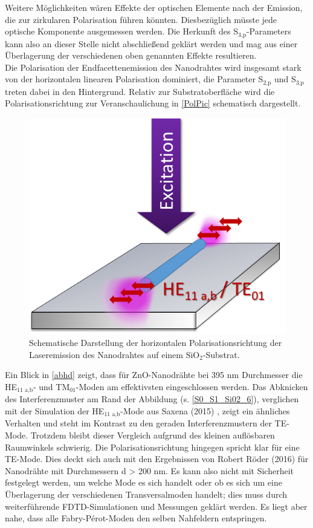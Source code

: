 Weitere Möglichkeiten wären Effekte der optischen Elemente nach der Emission, die zur zirkularen Polarisation führen könnten. Diesbezüglich müsste jede optische Komponente ausgemessen werden. Die Herkunft des S$_\text{3,p}$-Parameters kann also an dieser Stelle nicht abschließend geklärt werden und mag aus einer Überlagerung der verschiedenen oben genannten Effekte resultieren.\\
Die Polarisation der Endfacettenemission des Nanodrahtes wird insgesamt stark von der horizontalen linearen Polarisation dominiert, die Parameter S$_\text{2,p}$ und S$_\text{3,p}$ treten dabei in den Hintergrund. Relativ zur Substratoberfläche wird die Polarisationsrichtung zur Veranschaulichung in \autoref{PolPic} schematisch dargestellt.\begin{figure}[b]
\centering
\includegraphics[width=.35\textwidth]{Bilder/SiO2/PolPic}
\caption{Schematische Darstellung der horizontalen Polarisationsrichtung der Laseremission des Nanodrahtes auf einem SiO$_\text{2}$-Substrat.}
\label{PolPic}
\end{figure}Ein Blick in \autoref{abhd} zeigt, dass für ZnO-Nanodrähte bei 395 nm Durchmesser die HE$_\text{11 a,b}$- und TM$_\text{01}$-Moden am effektivsten eingeschlossen werden. Das Abknicken des Interferenzmuster am Rand der Abbildung (s. \autoref{S0_S1_Si02_6}), verglichen mit der Simulation der HE$_\text{11 a,b}$-Mode aus Saxena (2015) \cite{Saxena.2015}, zeigt ein ähnliches Verhalten und steht im Kontrast zu den geraden Interferenzmustern der TE-Mode. Trotzdem bleibt dieser Vergleich aufgrund des kleinen auflösbaren Raumwinkels schwierig. Die Polarisationsrichtung hingegen spricht klar für eine TE-Mode. Dies deckt sich auch mit den Ergebnissen von Robert Röder (2016) \cite{Roeder.2016} für Nanodrähte mit Durchmessern d > 200 nm.  Es kann also nicht mit Sicherheit festgelegt werden, um welche Mode es sich handelt oder ob es sich um eine Überlagerung der verschiedenen Transversalmoden handelt; dies muss durch weiterführende FDTD-Simulationen und Messungen geklärt werden. Es liegt aber nahe, dass alle Fabry-Pérot-Moden den selben Nahfeldern entspringen.
